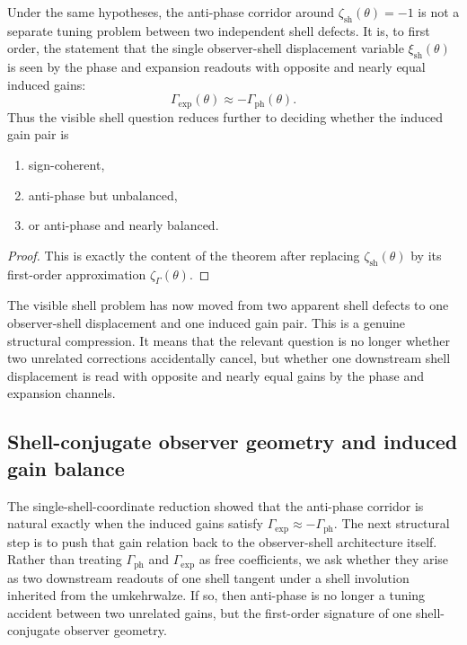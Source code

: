 \begin{corollary}
Under the same hypotheses, the anti-phase corridor around $\zeta_{\mathrm{sh}}(\theta)=-1$ is not a separate tuning problem between two independent shell defects. It is, to first order, the statement that the single observer-shell displacement variable $\xi_{\mathrm{sh}}(\theta)$ is seen by the phase and expansion readouts with opposite and nearly equal induced gains:
\[
  \Gamma_{\mathrm{exp}}(\theta)\approx -\Gamma_{\mathrm{ph}}(\theta).
\]
Thus the visible shell question reduces further to deciding whether the induced gain pair is
\begin{enumerate}[leftmargin=2em,label=(\roman*)]
\item sign-coherent,
\item anti-phase but unbalanced,
\item or anti-phase and nearly balanced.
\end{enumerate}
\end{corollary}

\begin{proof}
This is exactly the content of the theorem after replacing $\zeta_{\mathrm{sh}}(\theta)$ by its first-order approximation $\zeta_{\Gamma}(\theta)$.
\end{proof}

\begin{remark}
The visible shell problem has now moved from two apparent shell defects to one observer-shell displacement and one induced gain pair. This is a genuine structural compression. It means that the relevant question is no longer whether two unrelated corrections accidentally cancel, but whether one downstream shell displacement is read with opposite and nearly equal gains by the phase and expansion channels.
\end{remark}


\subsection*{Shell-conjugate observer geometry and induced gain balance}
The single-shell-coordinate reduction showed that the anti-phase corridor is natural exactly when the induced gains satisfy $\Gamma_{\mathrm{exp}}\approx-\Gamma_{\mathrm{ph}}$. The next structural step is to push that gain relation back to the observer-shell architecture itself. Rather than treating $\Gamma_{\mathrm{ph}}$ and $\Gamma_{\mathrm{exp}}$ as free coefficients, we ask whether they arise as two downstream readouts of one shell tangent under a shell involution inherited from the umkehrwalze. If so, then anti-phase is no longer a tuning accident between two unrelated gains, but the first-order signature of one shell-conjugate observer geometry.


